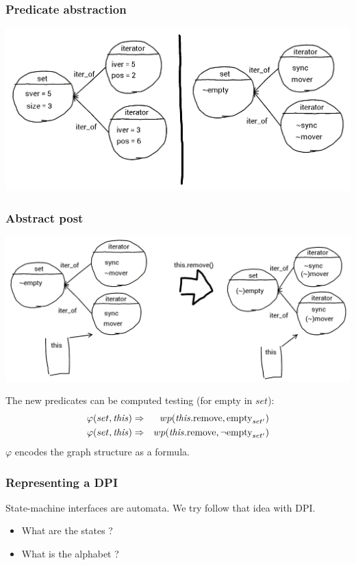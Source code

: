 \documentclass{beamer}
\newcommand{\this}{\ensuremath{\mathit{this}}}
\begin{document}
\begin{frame}
  \frametitle{Predicate abstraction}
  \includegraphics[width=\linewidth]{abstraction}
\end{frame}

\begin{frame}
  \frametitle{Abstract post}
  \includegraphics[width=\linewidth]{abs_post}

  \vspace{1ex}

  The new predicates can be computed testing (for empty in $set$):
  \begin{eqnarray*}
    \varphi(set,\this) & \Rightarrow & wp(\text{\this.remove}, \text{empty}_{set'}) \\
    \varphi(set,\this) & \Rightarrow & wp(\text{\this.remove}, \neg\text{empty}_{set'})
  \end{eqnarray*}
  $\varphi$ encodes the graph structure as a formula.
\end{frame}

\begin{frame}
  \frametitle{Representing a DPI}
  State-machine interfaces are automata.
  We try follow that idea with DPI.

  \vspace{2ex}

  \begin{itemize}
  \item What are the states ?
  \item What is the alphabet ?
  \end{itemize}

\end{frame}
\end{document}
